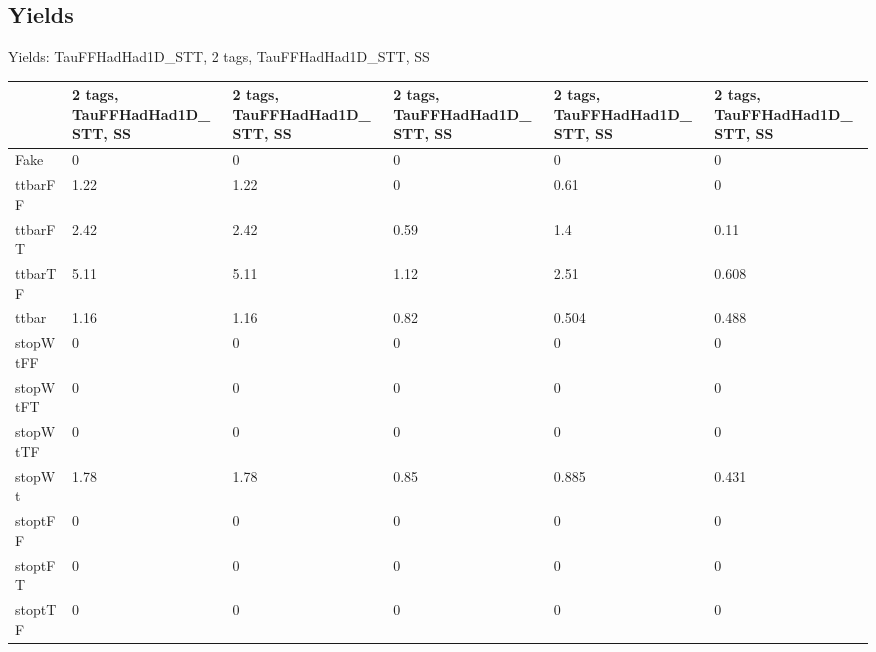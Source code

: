 
\subsection{Yields}

\begin{frame}{Yields: TauFFHadHad1D\_STT, 2 tags, TauFFHadHad1D\_STT, SS}
\begin{center}
  \begin{tabular}{l| >{\centering\let\newline\\\arraybackslash\hspace{0pt}}m{1.4cm}| >{\centering\let\newline\\\arraybackslash\hspace{0pt}}m{1.4cm}| >{\centering\let\newline\\\arraybackslash\hspace{0pt}}m{1.4cm}| >{\centering\let\newline\\\arraybackslash\hspace{0pt}}m{1.4cm}| >{\centering\let\newline\\\arraybackslash\hspace{0pt}}m{1.4cm}}
    & 2 tags, TauFFHadHad1D\_STT, SS & 2 tags, TauFFHadHad1D\_STT, SS & 2 tags, TauFFHadHad1D\_STT, SS & 2 tags, TauFFHadHad1D\_STT, SS & 2 tags, TauFFHadHad1D\_STT, SS \\
 \hline \hline
    Fake& 0 & 0 & 0 & 0 & 0 \\
 \hline
    ttbarFF& 1.22 & 1.22 & 0 & 0.61 & 0 \\
 \hline
    ttbarFT& 2.42 & 2.42 & 0.59 & 1.4 & 0.11 \\
 \hline
    ttbarTF& 5.11 & 5.11 & 1.12 & 2.51 & 0.608 \\
 \hline
    ttbar& 1.16 & 1.16 & 0.82 & 0.504 & 0.488 \\
 \hline
    stopWtFF& 0 & 0 & 0 & 0 & 0 \\
 \hline
    stopWtFT& 0 & 0 & 0 & 0 & 0 \\
 \hline
    stopWtTF& 0 & 0 & 0 & 0 & 0 \\
 \hline
    stopWt& 1.78 & 1.78 & 0.85 & 0.885 & 0.431 \\
 \hline
    stoptFF& 0 & 0 & 0 & 0 & 0 \\
 \hline
    stoptFT& 0 & 0 & 0 & 0 & 0 \\
 \hline
    stoptTF& 0 & 0 & 0 & 0 & 0 \\

\end{tabular}
\end{center}
\end{frame}
